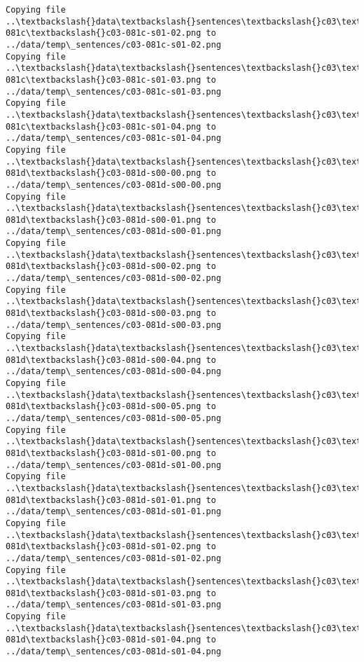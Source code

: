 \documentclass[11pt]{article}
\begin{document}
\begin{Verbatim}[commandchars=\\\{\}]
Copying file ..\textbackslash{}data\textbackslash{}sentences\textbackslash{}c03\textbackslash{}c03-081c\textbackslash{}c03-081c-s01-02.png to
../data/temp\_sentences/c03-081c-s01-02.png
Copying file ..\textbackslash{}data\textbackslash{}sentences\textbackslash{}c03\textbackslash{}c03-081c\textbackslash{}c03-081c-s01-03.png to
../data/temp\_sentences/c03-081c-s01-03.png
Copying file ..\textbackslash{}data\textbackslash{}sentences\textbackslash{}c03\textbackslash{}c03-081c\textbackslash{}c03-081c-s01-04.png to
../data/temp\_sentences/c03-081c-s01-04.png
Copying file ..\textbackslash{}data\textbackslash{}sentences\textbackslash{}c03\textbackslash{}c03-081d\textbackslash{}c03-081d-s00-00.png to
../data/temp\_sentences/c03-081d-s00-00.png
Copying file ..\textbackslash{}data\textbackslash{}sentences\textbackslash{}c03\textbackslash{}c03-081d\textbackslash{}c03-081d-s00-01.png to
../data/temp\_sentences/c03-081d-s00-01.png
Copying file ..\textbackslash{}data\textbackslash{}sentences\textbackslash{}c03\textbackslash{}c03-081d\textbackslash{}c03-081d-s00-02.png to
../data/temp\_sentences/c03-081d-s00-02.png
Copying file ..\textbackslash{}data\textbackslash{}sentences\textbackslash{}c03\textbackslash{}c03-081d\textbackslash{}c03-081d-s00-03.png to
../data/temp\_sentences/c03-081d-s00-03.png
Copying file ..\textbackslash{}data\textbackslash{}sentences\textbackslash{}c03\textbackslash{}c03-081d\textbackslash{}c03-081d-s00-04.png to
../data/temp\_sentences/c03-081d-s00-04.png
Copying file ..\textbackslash{}data\textbackslash{}sentences\textbackslash{}c03\textbackslash{}c03-081d\textbackslash{}c03-081d-s00-05.png to
../data/temp\_sentences/c03-081d-s00-05.png
Copying file ..\textbackslash{}data\textbackslash{}sentences\textbackslash{}c03\textbackslash{}c03-081d\textbackslash{}c03-081d-s01-00.png to
../data/temp\_sentences/c03-081d-s01-00.png
Copying file ..\textbackslash{}data\textbackslash{}sentences\textbackslash{}c03\textbackslash{}c03-081d\textbackslash{}c03-081d-s01-01.png to
../data/temp\_sentences/c03-081d-s01-01.png
Copying file ..\textbackslash{}data\textbackslash{}sentences\textbackslash{}c03\textbackslash{}c03-081d\textbackslash{}c03-081d-s01-02.png to
../data/temp\_sentences/c03-081d-s01-02.png
Copying file ..\textbackslash{}data\textbackslash{}sentences\textbackslash{}c03\textbackslash{}c03-081d\textbackslash{}c03-081d-s01-03.png to
../data/temp\_sentences/c03-081d-s01-03.png
Copying file ..\textbackslash{}data\textbackslash{}sentences\textbackslash{}c03\textbackslash{}c03-081d\textbackslash{}c03-081d-s01-04.png to
../data/temp\_sentences/c03-081d-s01-04.png

\end{Verbatim}
\end{document}

